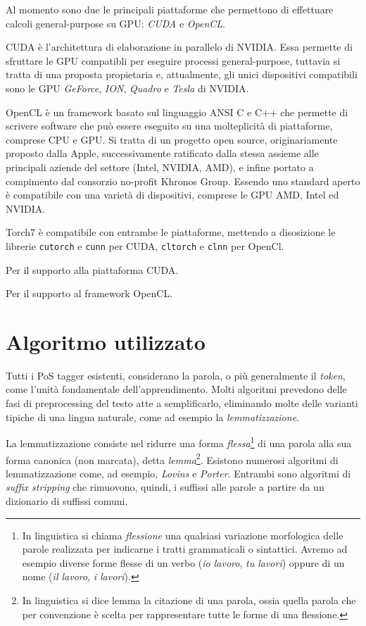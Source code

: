 Al momento sono due le principali piattaforme che permettono di effettuare calcoli general-purpose su GPU: \emph{CUDA} e \emph{OpenCL}.

CUDA \`e l'architettura di elaborazione in parallelo di NVIDIA.
Essa permette di sfruttare le GPU compatibli per eseguire processi general-purpose, tuttavia si tratta di una proposta propietaria e, attualmente, gli unici dispositivi compatibili sono le GPU \emph{GeForce}, \emph{ION}, \emph{Quadro} e \emph{Tesla} di NVIDIA.

OpenCL \`e un framework basato sul linguaggio ANSI C e C++ che permette di scrivere software che pu\`o essere eseguito su una molteplicit\`a di piattaforme, comprese CPU e GPU.
Si tratta di un progetto open source, originariamente proposto dalla Apple, successivamente ratificato dalla stessa assieme alle principali aziende del settore (Intel, NVIDIA, AMD), e infine portato a compimento dal consorzio no-profit Khronos Group.
Essendo uno standard aperto \`e compatibile con una variet\`a di dispositivi, comprese le GPU AMD, Intel ed NVIDIA.

Torch7 \`e compatibile con entrambe le piattaforme, mettendo a disosizione le librerie \texttt{cutorch} e \texttt{cunn} per CUDA, \texttt{cltorch} e \texttt{clnn} per OpenCl.



Per il supporto alla piattaforma CUDA.



Per il supporto al framework OpenCL.

\section{Algoritmo utilizzato}

Tutti i PoS tagger esistenti, considerano la parola, o pi\`u generalmente il \emph{token}, come l'unit\`a fondamentale dell'apprendimento.
Molti algoritmi prevedono delle fasi di preprocessing del testo atte a semplificarlo, eliminando molte delle varianti tipiche di una lingua naturale, come ad esempio la \emph{lemmatizzazione}.

La lemmatizzazione consiste nel ridurre una forma \emph{flessa}\footnote{In linguistica si chiama \emph{flessione} una qualsiasi variazione morfologica delle parole realizzata per indicarne i tratti grammaticali o sintattici. Avremo ad esempio diverse forme flesse di un verbo (\emph{io lavoro}, \emph{tu lavori}) oppure di un nome (\emph{il lavoro}, \emph{i lavori}).} di una parola alla sua forma canonica (non marcata), detta \emph{lemma}\footnote{In linguistica si dice lemma la citazione di una parola, ossia quella parola che per convenzione è scelta per rappresentare tutte le forme di una flessione.}.
Esistono numerosi algoritmi di lemmatizzazione come, ad esempio, \emph{Lovins} e \emph{Porter}.
Entrambi sono algoritmi di \emph{suffix stripping} che rimuovono, quindi, i suffissi alle parole a partire da un dizionario di suffissi comuni.

